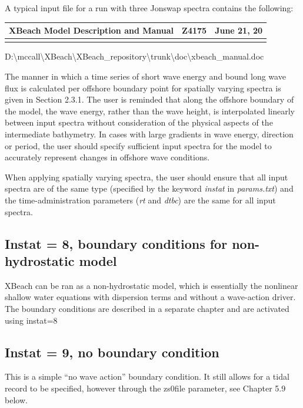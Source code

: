 A typical input file for a run with three Jonswap spectra contains the following:

\begin{tabular}{|p{1.5in}|p{1.5in}|p{1.5in}|} \hline 
XBeach Model Description and Manual & Z4175 & June 21, 20 \\ \hline 
&  &  \\ \hline 
\end{tabular}

D:\textbackslash mccall\textbackslash XBeach\textbackslash XBeach\_repository\textbackslash trunk\textbackslash doc\textbackslash xbeach\_manual.doc



The manner in which a time series of short wave energy and bound long wave flux is calculated per offshore boundary point for spatially varying spectra is given in Section 2.3.1. The user is reminded that along the offshore boundary of the model, the wave energy, rather than the wave height, is interpolated linearly between input spectra without consideration of the physical aspects of the intermediate bathymetry. In cases with large gradients in wave energy, direction or period, the user should specify sufficient input spectra for the model to accurately represent changes in offshore wave conditions. 

When applying spatially varying spectra, the user should ensure that all input spectra are of the same type (specified by the keyword \textit{instat} in \textit{params.txt}) and the time-administration parameters (\textit{rt} and \textit{dtbc}) are the same for all input spectra. 
\subsection{ Instat = 8, boundary conditions for non-hydrostatic model }

XBeach can be ran as a non-hydrostatic model, which is essentially the nonlinear shallow water  equations with dispersion terms and without a wave-action driver. The boundary conditions are described in a separate chapter and are activated using instat=8


\subsection{ Instat = 9, no boundary condition }

\underbar{}

This is a simple ``no wave action'' boundary condition. It still allows for a tidal record to be specified, however through the zs0file parameter, see Chapter 5.9 below.
